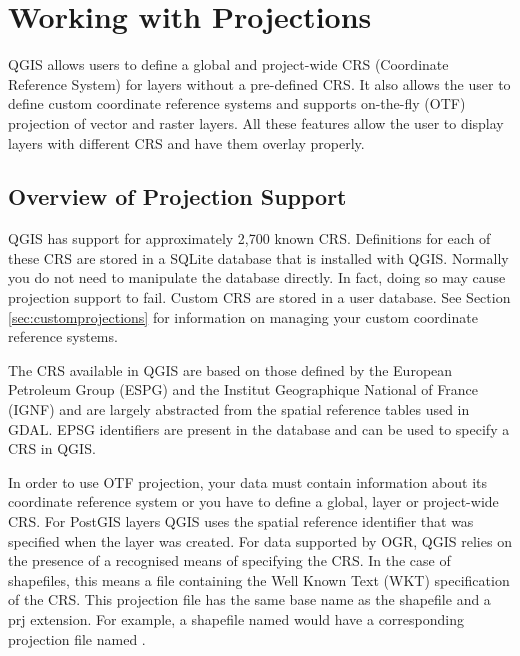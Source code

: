 
\chapter{Working with Projections}\label{label_projections}


QGIS allows users to define a global and project-wide CRS (Coordinate
Reference System) for layers without a pre-defined CRS. It also allows
the user to define custom coordinate reference systems and supports
on-the-fly (OTF) projection of vector and raster layers. All these
features allow the user to display layers with different CRS and have
them overlay properly.

\section{Overview of Projection Support}\label{label_projoverview}

QGIS has support for approximately 2,700 known CRS. Definitions for
each of these CRS are stored in a SQLite database that is installed with
QGIS. Normally you do not need to manipulate the database directly. In fact,
doing so may cause projection support to fail. Custom CRS are stored in a
user database. See Section \ref{sec:customprojections} for
information on managing your custom coordinate reference systems.

The CRS available in QGIS are based on those defined by the European
Petroleum Group (ESPG) and the Institut Geographique
National of France (IGNF) and are largely abstracted 
from the spatial reference tables used in GDAL. EPSG identifiers 
are present in the database and can be used to specify a CRS in QGIS.

In order to use OTF projection, your data must contain information about its
coordinate reference system or you have to define a global, layer or
project-wide CRS. For PostGIS layers QGIS uses the spatial reference
identifier that was specified when the layer was created. For data supported
by OGR, QGIS relies on the presence of a recognised means of specifying
the CRS. In the case of shapefiles, this means a file containing the Well
Known Text (WKT) specification of the CRS. This projection file
has the same base name as the shapefile and a prj extension. For example, a
shapefile named  would have a corresponding projection
file named .

